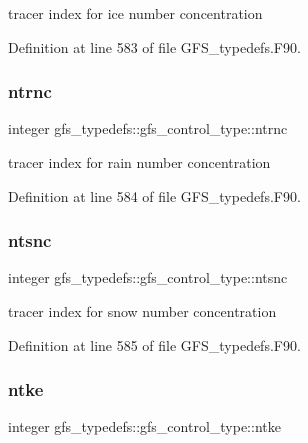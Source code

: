 tracer index for ice number concentration 



Definition at line 583 of file G\+F\+S\+\_\+typedefs.\+F90.

\mbox{\label{structgfs__typedefs_1_1gfs__control__type_ab94c67c338177311741b2245a098fa97}} 
\subsubsection{ntrnc}
{\footnotesize\ttfamily integer gfs\+\_\+typedefs\+::gfs\+\_\+control\+\_\+type\+::ntrnc}



tracer index for rain number concentration 



Definition at line 584 of file G\+F\+S\+\_\+typedefs.\+F90.

\mbox{\label{structgfs__typedefs_1_1gfs__control__type_ae48ebadee6b54223264f96630dfc901c}} 
\subsubsection{ntsnc}
{\footnotesize\ttfamily integer gfs\+\_\+typedefs\+::gfs\+\_\+control\+\_\+type\+::ntsnc}



tracer index for snow number concentration 



Definition at line 585 of file G\+F\+S\+\_\+typedefs.\+F90.

\mbox{\label{structgfs__typedefs_1_1gfs__control__type_ab699a76d80890f71139d3bd38fbc3461}} 
\subsubsection{ntke}
{\footnotesize\ttfamily integer gfs\+\_\+typedefs\+::gfs\+\_\+control\+\_\+type\+::ntke}



